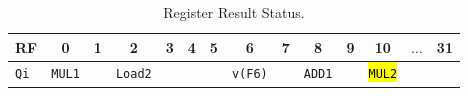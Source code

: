 \begin{enumerate}
    \begin{table}[!htp]
        \centering
        \begin{tabular}{@{} l | c c c c c c c c c c c c c @{}}
            \toprule
            RF              & 0                     & 1             & 2                     & 3             & 4             & 5             & 6                     & 7             & 8             & 9             & 10                    & $\dots$           & 31            \\
            \midrule
            \texttt{Qi}     & \texttt{MUL1}         &               & \texttt{Load2}        &               &               &               & \texttt{v(F6)}        &               & \texttt{ADD1} &               & \hl{\texttt{MUL2}}    &                   &               \\
            \bottomrule
        \end{tabular}
        \caption*{Register Result Status.}
    \end{table}

    \newpage



\end{enumerate}
